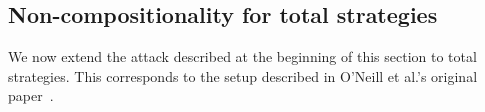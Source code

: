 \documentclass[preprint,5p,twocolumn]{elsarticle}
\begin{document}

\subsection{Non-compositionality for total strategies}

We now extend the attack described at the beginning of this section to total strategies. This corresponds to the
setup described in O'Neill et al.'s original paper~\cite{ONeill2006}.
\end{document}
